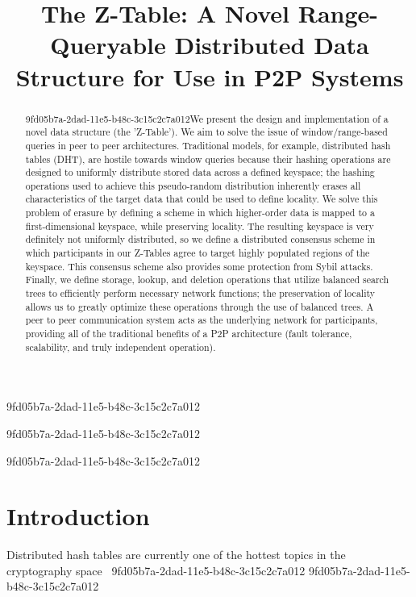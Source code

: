 \documentclass[12pt]{article}
\title{The Z-Table: A Novel Range-Queryable Distributed Data Structure for Use in P2P Systems}
\begin{document}
9fd05b7a-2dad-11e5-b48c-3c15c2c7a012
\maketitle

\begin{abstract}
9fd05b7a-2dad-11e5-b48c-3c15c2c7a012We present the design and implementation of a novel data structure (the 'Z-Table'). We aim to solve the issue of window/range-based queries in peer to peer architectures. Traditional models, for example,  distributed hash tables (DHT), are hostile towards window queries because their hashing operations are designed to uniformly distribute stored data across a defined keyspace; the hashing operations used to achieve this pseudo-random distribution inherently erases all characteristics of the target data that could be used to define locality. We solve this problem of erasure by defining a scheme in which higher-order data is mapped to a first-dimensional keyspace, while preserving locality. The resulting keyspace is very definitely not uniformly distributed, so we define a distributed consensus scheme in which participants in our Z-Tables agree to target highly populated regions of the keyspace. This consensus scheme also provides some protection from Sybil attacks. Finally, we define storage, lookup, and deletion operations that utilize balanced search trees to efficiently perform necessary network functions; the preservation of locality allows us to greatly optimize these operations through the use of balanced trees. A peer to peer communication system acts as the underlying network for participants, providing all of the traditional benefits of a P2P architecture (fault tolerance, scalability, and truly independent operation).
\end{abstract}
9fd05b7a-2dad-11e5-b48c-3c15c2c7a012

9fd05b7a-2dad-11e5-b48c-3c15c2c7a012\newpage
\section{Introduction}
Distributed hash tables are currently one of the hottest topics in the cryptography space~\cite{Stoica:2001dj,Rowstron:2001ea,Ratnasamy:2001wn}
9fd05b7a-2dad-11e5-b48c-3c15c2c7a012
9fd05b7a-2dad-11e5-b48c-3c15c2c7a012\printbibliography
\end{document}
